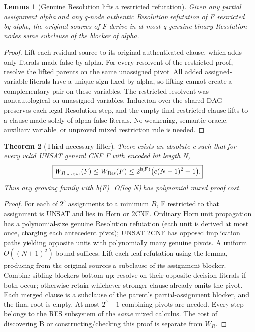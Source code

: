 \documentclass[11pt]{article}
\newtheorem{theorem}{Theorem}
\newtheorem{lemma}[theorem]{Lemma}
\begin{document}
\begin{lemma}[Genuine Resolution lifts a restricted refutation]
Given any partial assignment alpha and any q-node authentic Resolution refutation of F restricted by alpha, the original sources of F derive in at most q genuine binary Resolution nodes some subclause of the blocker of alpha.
\end{lemma}
\begin{proof}
Lift each residual source to its original authenticated clause, which adds only literals made false by alpha. For every resolvent of the restricted proof, resolve the lifted parents on the same unassigned pivot. All added assigned-variable literals have a unique sign fixed by alpha, so lifting cannot create a complementary pair on those variables. The restricted resolvent was nontautological on unassigned variables. Induction over the shared DAG preserves each legal Resolution step, and the empty final restricted clause lifts to a clause made solely of alpha-false literals. No weakening, semantic oracle, auxiliary variable, or unproved mixed restriction rule is needed.
\end{proof}
\begin{theorem}[Third necessary filter]
There exists an absolute c such that for every valid UNSAT general CNF F with encoded bit length N,
\[
\boxed{W_{R_{\rm mix341}}(F)\le W_{\rm Res}(F)\le
2^{b(F)}\bigl(c(N+1)^2+1\bigr).}
\]
Thus any growing family with b(F)=O(log N) has polynomial mixed proof cost.
\end{theorem}
\begin{proof}
For each of $2^b$ assignments to a minimum $B$, F restricted to that assignment is UNSAT and lies in Horn or 2CNF. Ordinary Horn unit propagation has a polynomial-size genuine Resolution refutation (each unit is derived at most once, charging each antecedent pivot); UNSAT 2CNF has opposed implication paths yielding opposite units with polynomially many genuine pivots. A uniform $O((N+1)^2)$ bound suffices. Lift each leaf refutation using the lemma, producing from the original sources a subclause of its assignment blocker. Combine sibling blockers bottom-up: resolve on their opposite decision literals if both occur; otherwise retain whichever stronger clause already omits the pivot. Each merged clause is a subclause of the parent's partial-assignment blocker, and the final root is empty. At most $2^b-1$ combining pivots are needed. Every step belongs to the RES subsystem of the \emph{same} mixed calculus. The cost of discovering B or constructing/checking this proof is separate from $W_R$.
\end{proof}
\end{document}
